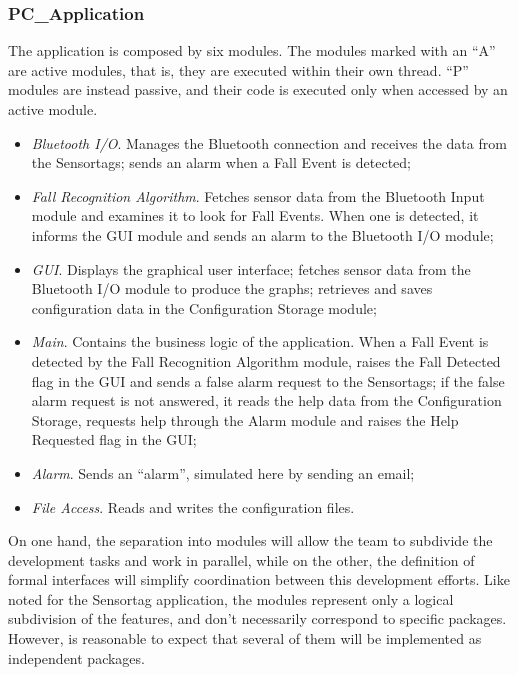 \documentclass[conference,12pt]{IEEETran}
\begin{document}
\subsubsection{PC\_Application}
The application is composed by six modules. The modules marked with an “A” are active modules, that is, they are executed within their own thread. “P” modules are instead passive, and their code is executed only when accessed by an active module.
\begin{itemize}
	\item \textit{Bluetooth I/O}. Manages the Bluetooth connection and receives the data from the Sensortags; sends an alarm when a Fall Event is detected;
	\item \textit{Fall Recognition Algorithm}. Fetches sensor data from the Bluetooth Input module and examines it to look for Fall Events. When one is detected, it informs the GUI module and sends an alarm to the Bluetooth I/O module; 
	\item \textit{GUI}. Displays the graphical user interface; fetches sensor data from the Bluetooth I/O module to produce the graphs; retrieves and saves configuration data in the Configuration Storage module;
	\item \textit{Main}. Contains the business logic of the application. When a Fall Event is detected by the Fall Recognition Algorithm module, raises the Fall Detected flag in the GUI and sends a false alarm request to the Sensortags; if the false alarm request is not answered, it reads the help data from the Configuration Storage, requests help through the Alarm module and raises the Help Requested flag in the GUI;
	\item \textit{Alarm}. Sends an “alarm”, simulated here by sending an email;
	\item \textit{File Access}. Reads and writes the configuration files.
\end{itemize}
On one hand, the separation into modules will allow the team to subdivide the development tasks and work in parallel, while on the other, the definition of formal interfaces will simplify coordination between this development efforts.
Like noted for the Sensortag application, the modules represent only a logical subdivision of the features, and don’t necessarily correspond to specific packages. However, is reasonable to expect that several of them will be implemented as independent packages. 
\end{document}
